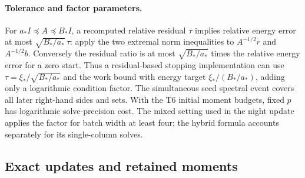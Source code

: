 \documentclass[11pt]{article}
\begin{document}
\paragraph{Tolerance and factor parameters.}
For $a_*I\preceq A\preceq B_*I$, a recomputed relative residual
$\tau$ implies relative energy error at most
$\sqrt{B_*/a_*}\,\tau$: apply the two extremal norm inequalities
to $A^{-1/2}r$ and $A^{-1/2}b$. Conversely the residual ratio is
at most $\sqrt{B_*/a_*}$ times the relative energy error for a zero
start. Thus a residual-based stopping implementation can use
$\tau=\xi_*/\sqrt{B_*/a_*}$ and the work bound with energy target
$\xi_* /(B_*/a_*)$, adding only a logarithmic condition factor.
The simultaneous seed spectral event covers all later right-hand
sides and sets. With the T6 initial moment budgets, fixed $p$
has logarithmic solve-precision cost. The mixed setting used in
the night update applies the factor for batch width at least four;
the hybrid formula accounts separately for its single-column solves.

\subsection{Exact updates and retained moments}
\end{document}
